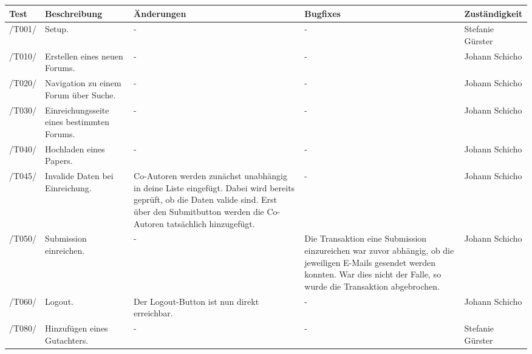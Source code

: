 \begin{table}[H]
	\centering
	\begin{tabular}{m{1.2cm}|m{3cm}|m{3.5cm}|m{3.5cm}|l}
		\toprule
		\textbf{Test} & \textbf{Beschreibung} & \textbf{Änderungen} & \textbf{Bugfixes} & \textbf{Zuständigkeit} \\\midrule
		/T001/ & Setup. & - & - & Stefanie Gürster \\\midrule
		/T010/ & Erstellen eines neuen Forums. & - & - & Johann Schicho \\\midrule
		/T020/ & Navigation zu einem Forum über Suche. & - & - & Johann Schicho \\\midrule
		/T030/ & Einreichungsseite eines bestimmten Forums. & - & - & Johann Schicho \\\midrule
		/T040/ & Hochladen eines Papers. & - & - & Johann Schicho \\\midrule
		/T045/ & Invalide Daten bei Einreichung. & Co-Autoren werden zunächst unabhängig in deine Liste eingefügt. Dabei wird bereits geprüft, ob die Daten valide sind. Erst über den Submitbutton werden die Co-Autoren tatsächlich hinzugefügt. & - & Johann Schicho \\\midrule
		/T050/ & Submission einreichen. & - & Die Transaktion eine Submission einzureichen war zuvor abhängig, ob die jeweiligen E-Mails gesendet werden konnten. War dies nicht der Falle, so wurde die Transaktion abgebrochen. & Johann Schicho \\\midrule
		/T060/ & Logout. & Der Logout-Button ist nun direkt erreichbar. & - & Johann Schicho \\\midrule
		/T080/ & Hinzufügen eines Gutachters. & - & - & Stefanie Gürster \\\midrule
					
		
	\end{tabular}
\end{table}

